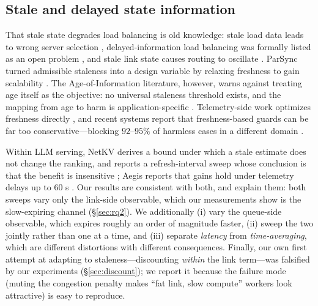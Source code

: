 \subsection{Stale and delayed state information}
That stale state degrades load balancing is old knowledge: stale load data leads to wrong server
selection \cite{staleloadold}, delayed-information load balancing was formally listed as an open
problem \cite{delayedopen}, and stale link state causes routing to oscillate
\cite{stalelinkqos}. ParSync turned admissible staleness into a design variable by relaxing
freshness to gain scalability \cite{parsync}. The Age-of-Information literature, however, warns
against treating age itself as the objective: no universal staleness threshold exists, and the
mapping from age to harm is application-specific \cite{aoisurvey,timelyremote}. Telemetry-side
work optimizes freshness directly \cite{freshint}, and recent systems report that
freshness-based guards can be far too conservative---blocking $92$--$95\%$ of harmless cases in a
different domain \cite{staleguard}.

Within LLM serving, NetKV derives a bound under which a stale estimate does not change the
ranking, and reports a refresh-interval sweep whose conclusion is that the benefit is
insensitive \cite{netkv}; Aegis reports that gains hold under telemetry delays up to
60 s \cite{aegis}. Our results are consistent with both, and explain them: both
sweeps vary only the link-side observable, which our measurements show is the slow-expiring
channel (\S\ref{sec:rq2}). We additionally (i) vary the queue-side observable, which expires
roughly an order of magnitude faster, (ii) sweep the two jointly rather than one at a time, and
(iii) separate \emph{latency} from \emph{time-averaging}, which are different distortions with
different consequences. Finally, our own first attempt at adapting to staleness---discounting
\emph{within} the link term---was falsified by our experiments (\S\ref{sec:discount}); we report
it because the failure mode (muting the congestion penalty makes ``fat link, slow compute''
workers look attractive) is easy to reproduce.


